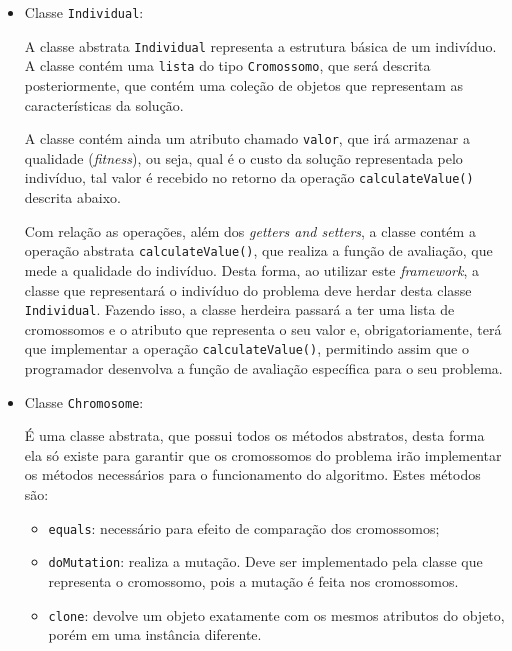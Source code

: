 \begin{itemize}
\begin{itemize}
	\end{itemize}
	
	\item Classe \texttt{Individual}:
	\par A classe abstrata \texttt{Individual} representa a estrutura básica de um indivíduo. 
	A classe contém uma \texttt{lista} do tipo 
	\texttt{Cromossomo}, que será descrita posteriormente, que contém uma coleção
	de objetos que representam as características da solução.
	
	\par A classe contém ainda um atributo chamado \texttt{valor}, que irá armazenar a qualidade (\textit{fitness}), ou seja, qual é o custo
	da solução representada pelo indivíduo, tal valor é recebido no retorno da
	operação \texttt{calculateValue()} descrita abaixo.
	
	\par Com relação as operações, além dos \textit{getters and setters}, a classe contém a operação abstrata 
	\texttt{calculateValue()}, que realiza a função de avaliação, que mede a qualidade do indivíduo. Desta forma, ao utilizar este \textit{framework}, a classe que representará o indivíduo do problema
	deve herdar desta classe  \texttt{Individual}. Fazendo isso, a classe herdeira passará a ter uma lista de cromossomos 
	e o atributo que representa o seu valor e, obrigatoriamente, terá que implementar a operação 
	\texttt{calculateValue()}, permitindo assim que o programador 
	desenvolva a função de avaliação específica para o seu problema.
	
	
	\item Classe \texttt{Chromosome}:
	\par É uma classe abstrata, que possui todos os métodos abstratos, desta forma
	ela só existe para garantir que os cromossomos do problema irão implementar os
	métodos necessários para o funcionamento do algoritmo. Estes métodos são:
	
	\begin{itemize}
		
		\item \texttt{equals}: necessário para efeito de comparação dos cromossomos;
		
		\item \texttt{doMutation}: realiza a mutação. Deve
		ser implementado pela classe que representa o cromossomo, pois a
		mutação é feita nos cromossomos.
		
		\item \texttt{clone}: devolve um objeto exatamente com os mesmos
		atributos do objeto, porém em uma instância diferente.
		

\end{itemize}
\end{itemize}
